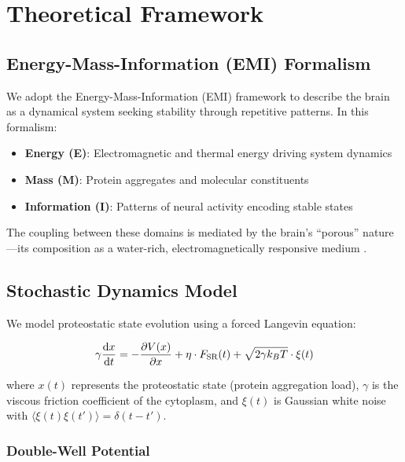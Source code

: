 \documentclass[10pt,a4paper]{article}
\begin{document}
\section{Theoretical Framework}

\subsection{Energy-Mass-Information (EMI) Formalism}

We adopt the Energy-Mass-Information (EMI) framework \citep{cavaglia2023porous} to 
describe the brain as a dynamical system seeking stability through repetitive patterns. 
In this formalism:

\begin{itemize}
    \item \textbf{Energy (E)}: Electromagnetic and thermal energy driving system dynamics
    \item \textbf{Mass (M)}: Protein aggregates and molecular constituents
    \item \textbf{Information (I)}: Patterns of neural activity encoding stable states
\end{itemize}

The coupling between these domains is mediated by the brain's ``porous'' nature---its 
composition as a water-rich, electromagnetically responsive medium \citep{pollack2001cells, 
chaplin2006water}.

\subsection{Stochastic Dynamics Model}

We model proteostatic state evolution using a forced Langevin equation:

\begin{equation}
    \gamma \dv{x}{t} = -\pdv{V(x)}{x} + \eta \cdot F_{\text{SR}}(t) + \sqrt{2\gamma k_B T} \cdot \xi(t)
    \label{eq:langevin}
\end{equation}

where $x(t)$ represents the proteostatic state (protein aggregation load), $\gamma$ is 
the viscous friction coefficient of the cytoplasm, and $\xi(t)$ is Gaussian white noise 
with $\langle \xi(t) \xi(t') \rangle = \delta(t-t')$.

\subsubsection{Double-Well Potential}
\end{document}
